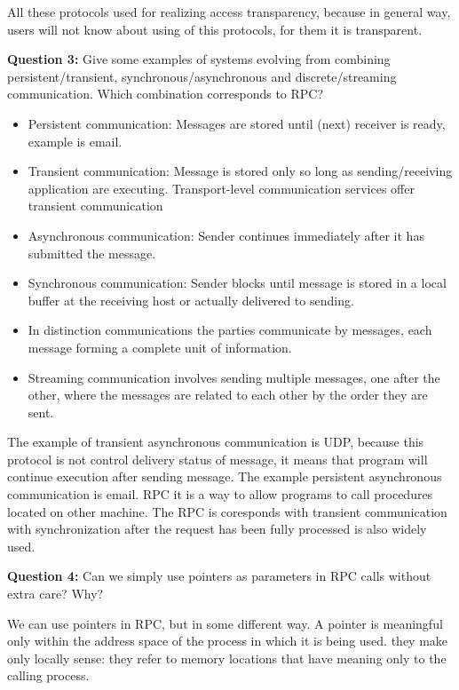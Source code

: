 \documentclass[12pt,a4paper]{report}
\begin{document}
All these protocols used for realizing access transparency, because in general way, users will not know about using of this protocols, for them it is transparent.
\bigbreak

\textbf{Question 3:} Give some examples of systems evolving from combining persistent/transient, synchronous/asynchronous and discrete/streaming communication. Which combination corresponds to RPC?
\bigbreak

\begin{itemize}
	\item{Persistent communication: Messages are stored until (next) receiver is ready, example is email.}
	\item{Transient communication: Message is stored only so long as sending/receiving application are executing. Transport-level communication services offer transient communication}
	\item{Asynchronous communication: Sender continues immediately after it has submitted the message.}
	\item{Synchronous communication: Sender blocks until message is stored in a local buffer at the receiving host or actually delivered to sending.}
	\item{In distinction communications the parties communicate by messages, each message forming a complete unit of information. }
	\item{Streaming communication involves sending multiple messages, one after the other, where the messages are related to each other by the order they are sent.}
\end{itemize}

The example of transient asynchronous communication is UDP, because this protocol is not control delivery status of message, it means that program will continue execution after sending message. The example persistent asynchronous communication is email.
RPC it is a way to allow programs to call procedures located on other machine. The RPC is coresponds with transient communication with synchronization after the request has been fully processed is also widely used.
\bigbreak

\textbf{Question 4:} Can we simply use pointers as parameters in RPC calls without extra care? Why?
\bigbreak

We can use pointers in RPC, but in some different way. A pointer is meaningful only within the address space of the process in which it is being used. they make only locally sense: they refer to memory locations that have meaning only to the calling process. 
\end{document}
